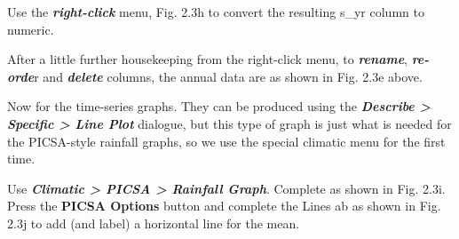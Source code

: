 \documentclass[
  letterpaper,
  DIV=11,
  numbers=noendperiod]{scrreprt}
\begin{document}
Use the \textbf{\emph{right-click}} menu, Fig. 2.3h to convert the
resulting s\_yr column to numeric.

After a little further housekeeping from the right-click menu, to
\textbf{\emph{rename}}, \textbf{\emph{re-orde}}r and
\textbf{\emph{delete}} columns, the annual data are as shown in Fig.
2.3e above.

Now for the time-series graphs. They can be produced using the
\textbf{\emph{Describe \textgreater{} Specific \textgreater{} Line
Plot}} dialogue, but this type of graph is just what is needed for the
PICSA-style rainfall graphs, so we use the special climatic menu for the
first time.

Use \textbf{\emph{Climatic \textgreater{} PICSA \textgreater{} Rainfall
Graph}}. Complete as shown in Fig. 2.3i. Press the \textbf{PICSA
Options} button and complete the Lines ab as shown in Fig. 2.3j to add
(and label) a horizontal line for the mean.
\end{document}
